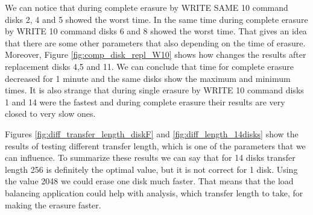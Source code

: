 We can notice that during complete erasure by WRITE SAME 10 command disks 2, 4 and 5 showed the worst time. In the same time during complete erasure by WRITE 10 command disks 6 and 8 showed the worst time. That gives an idea that there are some other parameters that also depending on the time of erasure. Moreover, Figure \ref{fig:comp_disk_repl_W10} shows how changes the results after replacement disks 4,5 and 11. We can conclude that time for complete erasure decreased for 1 minute and the same disks show the maximum and minimum times. It is also strange that during single erasure by WRITE 10 command disks 1 and 14 were the fastest and during complete erasure their results are very closed to very slow ones.

Figures \ref{fig:diff_transfer_length_diskF} and \ref{fig:diff_length_14disks} show the results of testing different transfer length, which is one of the parameters that we can influence. To summarize these results we can say that for 14 disks transfer length 256 is definitely the optimal value, but it is not correct for 1 disk. Using the value 2048 we could erase one disk much faster. That means that the load balancing application could help with analysis, which transfer length to take, for making the erasure faster.
